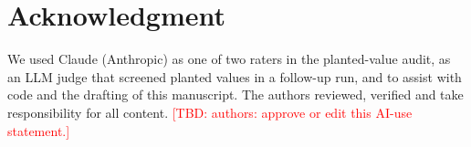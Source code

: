 \documentclass[conference]{IEEEtran}
\newcommand{\tbd}[1]{\textcolor{red}{[TBD: #1]}}
\begin{document}
\section*{Acknowledgment}
We used Claude (Anthropic) as one of two raters in the planted-value audit, as an LLM judge that screened planted values in a follow-up run, and to assist with code and the drafting of this manuscript. The authors reviewed, verified and take responsibility for all content. \tbd{authors: approve or edit this AI-use statement.}



\end{document}

